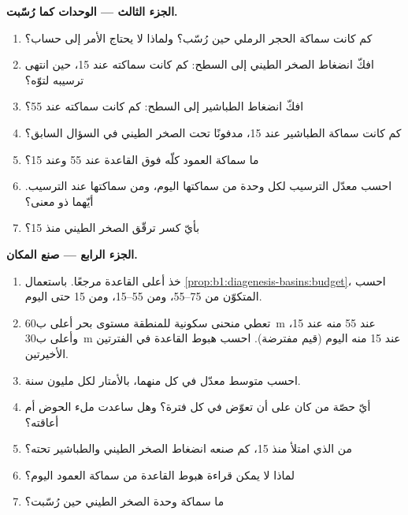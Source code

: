 \begin{problem}
\noindent\textbf{الجزء الثالث --- الوحدات كما رُسّبت.}
\begin{enumerate}[resume]
  \item كم كانت سماكة الحجر الرملي حين رُسّب؟ ولماذا لا يحتاج الأمر إلى حساب؟
  \item افكّ انضغاط الصخر الطيني إلى السطح: كم كانت سماكته عند \qty{15}{\Ma}، حين انتهى ترسيبه لتوّه؟
  \item افكّ انضغاط الطباشير إلى السطح: كم كانت سماكته عند \qty{55}{\Ma}؟
  \item كم كانت سماكة الطباشير عند \qty{15}{\Ma}، مدفونًا تحت الصخر الطيني في السؤال السابق؟
  \item ما سماكة العمود كلّه فوق القاعدة عند \qty{55}{\Ma} وعند \qty{15}{\Ma}؟
  \item احسب معدّل الترسيب لكل وحدة من سماكتها اليوم، ومن سماكتها عند الترسيب. أيّهما ذو معنى؟
  \item بأيّ كسر ترقّق الصخر الطيني منذ \qty{15}{\Ma}؟
\end{enumerate}

\noindent\textbf{الجزء الرابع --- صنع المكان.}
\begin{enumerate}[resume]
  \item خذ أعلى القاعدة مرجعًا. باستعمال \cref{prop:b1:diagenesis-basins:budget}، احسب  المتكوّن من \qtyrange{75}{55}{\Ma}، ومن \qtyrange{55}{15}{\Ma}، ومن \qty{15}{\Ma} حتى اليوم.
  \item تعطي منحنى سكونية للمنطقة مستوى بحر أعلى ب\qty{60}{m} عند \qty{55}{\Ma} منه عند \qty{15}{\Ma}، وأعلى ب\qty{30}{m} عند \qty{15}{\Ma} منه اليوم (قيم مفترضة). احسب هبوط القاعدة في الفترتين الأخيرتين.
  \item احسب متوسط معدّل  في كل منهما، بالأمتار لكل مليون سنة.
  \item أيّ حصّة من  كان على  أن تعوّض في كل فترة؟ وهل ساعدت  ملء الحوض أم أعاقته؟
  \item من  الذي امتلأ منذ \qty{15}{\Ma}، كم صنعه انضغاط الصخر الطيني والطباشير تحته؟
  \item لماذا لا يمكن قراءة هبوط القاعدة من سماكة العمود اليوم؟
  \item ما سماكة وحدة الصخر الطيني حين رُسّبت؟
\end{enumerate}
\end{problem}
